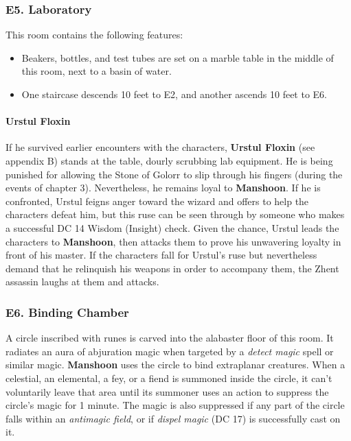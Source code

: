 \documentclass[10pt,a4paper,twoside,twocolumn,openany,nodeprecatedcode]{dndbook}
\begin{document}
\subsubsection{E5. Laboratory}
This room contains the following features:
\begin{itemize}

\item Beakers, bottles, and test tubes are set on a marble table in the middle of this room, next to a basin of water.
\item One staircase descends 10 feet to E2, and another ascends 10 feet to E6.
\end{itemize}


\paragraph{Urstul Floxin}
If he survived earlier encounters with the characters, \textbf{Urstul Floxin} (see appendix B) stands at the table, dourly scrubbing lab equipment. He is being punished for allowing the Stone of Golorr to slip through his fingers (during the events of chapter 3). Nevertheless, he remains loyal to \textbf{Manshoon}. If he is confronted, Urstul feigns anger toward the wizard and offers to help the characters defeat him, but this ruse can be seen through by someone who makes a successful DC 14 Wisdom (Insight) check. Given the chance, Urstul leads the characters to \textbf{Manshoon}, then attacks them to prove his unwavering loyalty in front of his master.
If the characters fall for Urstul's ruse but nevertheless demand that he relinquish his weapons in order to accompany them, the Zhent assassin laughs at them and attacks.
\subsubsection{E6. Binding Chamber}
A circle inscribed with runes is carved into the alabaster floor of this room. It radiates an aura of abjuration magic when targeted by a \textit{detect magic} spell or similar magic.
\textbf{Manshoon} uses the circle to bind extraplanar creatures. When a celestial, an elemental, a fey, or a fiend is summoned inside the circle, it can't voluntarily leave that area until its summoner uses an action to suppress the circle's magic for 1 minute. The magic is also suppressed if any part of the circle falls within an \textit{antimagic field}, or if \textit{dispel magic} (DC 17) is successfully cast on it.
\end{document}
